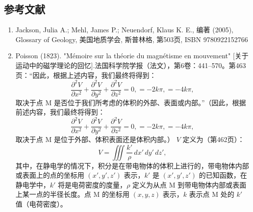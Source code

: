 \subsection{参考文献}  
\begin{enumerate}
\item Jackson, Julia A.; Mehl, James P.; Neuendorf, Klaus K. E., 编著 (2005), Glossary of Geology, 美国地质学会, 斯普林格, 第503页, ISBN 9780922152766  
\item Poisson (1823). "Mémoire sur la théorie du magnétisme en mouvement" [关于运动中的磁学理论的回忆].法国科学院学报（法文），第6卷：441–570。第463页：“因此，根据上述内容，我们最终将得到：  
\[
\frac{\partial^2 V}{\partial x^2} + \frac{\partial^2 V}{\partial y^2} + \frac{\partial^2 V}{\partial z^2} = 0, = -2k\pi, = -4k\pi,~
\]
取决于点 M 是否位于我们所考虑的体积的外部、表面或内部。”（因此，根据前述内容，我们最终将得到：  
\[
\frac{\partial^2 V}{\partial x^2} + \frac{\partial^2 V}{\partial y^2} + \frac{\partial^2 V}{\partial z^2} = 0, = -2k\pi, = -4k\pi,~
\]
取决于点 M 是位于外部、体积表面还是体积内部。）  
\(V\) 定义为（第462页）：  
\[
V = \iiint \frac{k'}{\rho} \, dx' \, dy' \, dz',~
\]
其中，在静电学的情况下，积分是在带电物体的体积上进行的，带电物体内部或表面上的点的坐标用 \((x', y', z')\) 表示，\(k'\) 是 \( (x', y', z') \) 的已知函数，在静电学中，\(k'\) 将是电荷密度的度量，\(\rho\) 定义为从点 M 到带电物体内部或表面上某一点的半径长度。点 M 的坐标用 \((x, y, z)\) 表示，\(k\) 表示点 M 处的 \(k'\) 值（电荷密度）。
\end{enumerate}